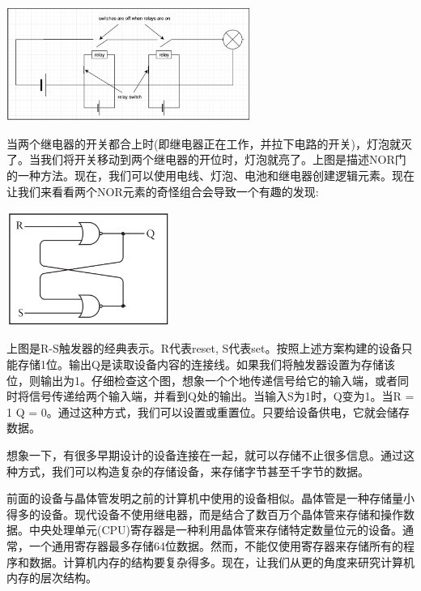 \begin{center}
	\includegraphics[width=0.6\textwidth]{content/Section-1/Chapter-5/3}
\end{center}

当两个继电器的开关都合上时(即继电器正在工作，并拉下电路的开关)，灯泡就灭了。当我们将开关移动到两个继电器的开位时，灯泡就亮了。上图是描述NOR门的一种方法。现在，我们可以使用电线、灯泡、电池和继电器创建逻辑元素。现在让我们来看看两个NOR元素的奇怪组合会导致一个有趣的发现: \par

\begin{center}
	\includegraphics[width=0.4\textwidth]{content/Section-1/Chapter-5/4}
\end{center}

上图是R-S触发器的经典表示。R代表reset, S代表set。按照上述方案构建的设备只能存储1位。输出Q是读取设备内容的连接线。如果我们将触发器设置为存储该位，则输出为1。仔细检查这个图，想象一个个地传递信号给它的输入端，或者同时将信号传递给两个输入端，并看到Q处的输出。当输入S为1时，Q变为1。当R = 1 Q = 0。通过这种方式，我们可以设置或重置位。只要给设备供电，它就会储存数据。 \par
想象一下，有很多早期设计的设备连接在一起，就可以存储不止很多信息。通过这种方式，我们可以构造复杂的存储设备，来存储字节甚至千字节的数据。 \par
前面的设备与晶体管发明之前的计算机中使用的设备相似。晶体管是一种存储量小得多的设备。现代设备不使用继电器，而是结合了数百万个晶体管来存储和操作数据。中央处理单元(CPU)寄存器是一种利用晶体管来存储特定数量位元的设备。通常，一个通用寄存器最多存储64位数据。然而，不能仅使用寄存器来存储所有的程序和数据。计算机内存的结构要复杂得多。现在，让我们从更的角度来研究计算机内存的层次结构。 \par

